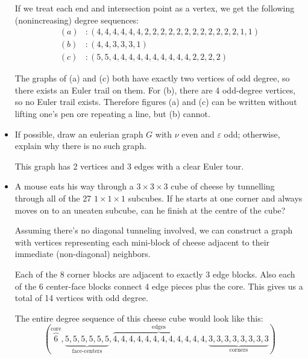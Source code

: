 \documentclass[11pt]{article}
\newcommand\itm[1]{\item[\textbf{#1}]}
\newcommand{\n}{\vspace{0.5cm}}
\begin{document}
\begin{itemize}
    If we treat each end and intersection point as a vertex, we get the following (nonincreasing) degree sequences:
    \begin{align*}
      (a) &: (4,4,4,4,4,4,2,2,2,2,2,2,2,2,2,2,2,2,1,1) \\
      (b) &: (4,4,3,3,3,1) \\
      (c) &: (5,5,4,4,4,4,4,4,4,4,4,4,2,2,2,2)
    \end{align*}

    The graphs of (a) and (c) both have exactly two vertices of odd degree, so there exists an Euler trail on them.  For (b), there are 4 odd-degree vertices, so no Euler trail exists.  Therefore figures (a) and (c) can be written without lifting one's pen ore repeating a line, but (b) cannot. \n

  \itm{4.1.2} If possible, draw an eulerian graph \(G\) with \(\nu\) even and \(\varepsilon\) odd; otherwise, explain why there is no such graph.
    \begin{center}
      \resizebox{!}{2cm} {
        \hfil
      }
    \end{center}
    This graph has 2 vertices and 3 edges with a clear Euler tour. \n
  



  \itm{4.2.2} A mouse eats his way through a \(3 \times 3 \times 3\) cube of cheese by tunnelling through all of the 27 \(1 \times 1 \times 1\) subcubes.  If he starts at one corner and always moves on to an uneaten subcube, can he finish at the centre of the cube?

  Assuming there's no diagonal tunneling involved, we can construct a graph with vertices representing each mini-block of cheese adjacent to their immediate (non-diagonal) neighbors.

  Each of the 8 corner blocks are adjacent to exactly 3 edge blocks.  Also each of the 6 center-face blocks connect 4 edge pieces plus the core.  This gives us a total of 14 vertices with odd degree.

  The entire degree sequence of this cheese cube would look like this:
  \[(\overbrace{6}^{\text{core}},\underbrace{5,5,5,5,5,5}_{\text{face-centers}},\overbrace{4,4,4,4,4,4,4,4,4,4,4,4}^{\text{edges}},\underbrace{3,3,3,3,3,3,3,3}_{\text{corners}})\]


\end{itemize}
\end{document}
